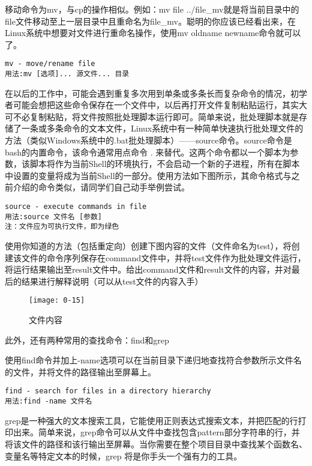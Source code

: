 移动命令为mv，与cp的操作相似。例如：mv file ../file\_mv就是将当前目录中的file文件移动至上一层目录中且重命名为file\_mv。聪明的你应该已经看出来，在Linux系统中想要对文件进行重命名操作，使用mv oldname newname命令就可以了。
\begin{verbatim}
mv - move/rename file
用法:mv [选项]... 源文件... 目录
\end{verbatim}

在以后的工作中，可能会遇到重复多次用到单条或多条长而复杂命令的情况，初学者可能会想把这些命令保存在一个文件中，以后再打开文件复制粘贴运行，其实大可不必复制粘贴，将文件按照批处理脚本运行即可。简单来说，批处理脚本就是存储了一条或多条命令的文本文件，Linux系统中有一种简单快速执行批处理文件的方法（类似Windows系统中的.bat批处理脚本）——source命令。source命令是bash的内置命令，该命令通常用点命令 . 来替代。这两个命令都以一个脚本为参数，该脚本将作为当前Shell的环境执行，不会启动一个新的子进程，所有在脚本中设置的变量将成为当前Shell的一部分。使用方法如下图所示，其命令格式与之前介绍的命令类似，请同学们自己动手举例尝试。

\begin{verbatim}
source - execute commands in file
用法:source 文件名 [参数]
注：文件应为可执行文件，即为绿色
\end{verbatim}

\begin{thinking}\label{think-文件的操作}
使用你知道的方法（包括重定向）创建下图内容的文件（文件命名为test），将创建该文件的命令序列保存在command文件中，并将test文件作为批处理文件运行，将运行结果输出至result文件中。给出command文件和result文件的内容，并对最后的结果进行解释说明（可以从test文件的内容入手）
\end{thinking}
\begin{figure}[htbp]
	\centering
	\texttt{[image: 0-15]}
	\caption{文件内容}\label{fig:0-15}
\end{figure}

此外，还有两种常用的查找命令：find和grep

使用find命令并加上-name选项可以在当前目录下递归地查找符合参数所示文件名的文件，并将文件的路径输出至屏幕上。

\begin{verbatim}
find - search for files in a directory hierarchy
用法:find -name 文件名
\end{verbatim}

grep是一种强大的文本搜索工具，它能使用正则表达式搜索文本，并把匹配的行打印出来。简单来说，grep命令可以从文件中查找包含pattern部分字符串的行，并将该文件的路径和该行输出至屏幕。当你需要在整个项目目录中查找某个函数名、变量名等特定文本的时候，grep 将是你手头一个强有力的工具。


